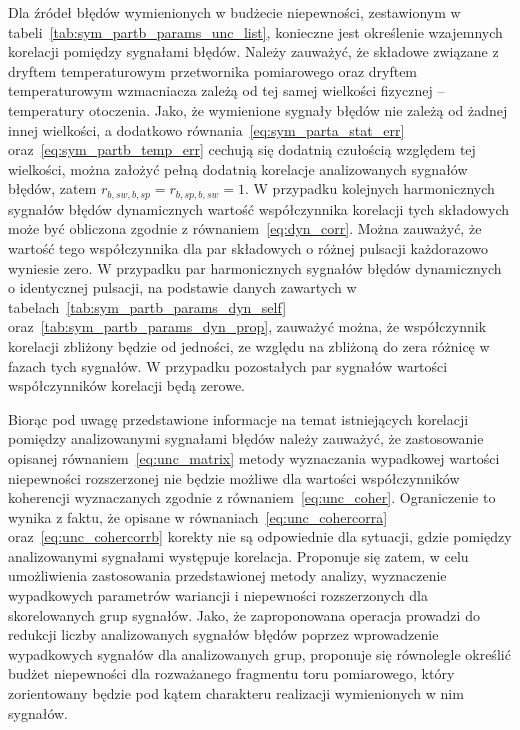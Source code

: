 Dla źródeł błędów wymienionych w budżecie niepewności, zestawionym w tabeli~\ref{tab:sym_partb_params_unc_list}, konieczne jest określenie wzajemnych korelacji pomiędzy sygnałami błędów. Należy zauważyć, że składowe związane z dryftem temperaturowym przetwornika pomiarowego oraz dryftem temperaturowym wzmacniacza zależą od tej samej wielkości fizycznej -- temperatury otoczenia. Jako, że wymienione sygnały błędów nie zależą od żadnej innej wielkości, a dodatkowo równania~\eqref{eq:sym_parta_stat_err} oraz~\eqref{eq:sym_partb_temp_err} cechują się dodatnią czułością względem tej wielkości, można założyć pełną dodatnią korelacje analizowanych sygnałów błędów, zatem $r_{b,sw,b,sp} = r_{b,sp,b,sw} = 1$. W przypadku kolejnych harmonicznych sygnałów błędów dynamicznych wartość współczynnika korelacji tych składowych może być obliczona zgodnie z równaniem~\eqref{eq:dyn_corr}. Można zauważyć, że wartość tego współczynnika dla par składowych o różnej pulsacji każdorazowo wyniesie zero. W przypadku par harmonicznych sygnałów błędów dynamicznych o identycznej pulsacji, na podstawie danych zawartych w tabelach~\ref{tab:sym_partb_params_dyn_self} oraz~\ref{tab:sym_partb_params_dyn_prop}, zauważyć można, że współczynnik korelacji zbliżony będzie od jedności, ze względu na zbliżoną do zera różnicę w fazach tych sygnałów. W przypadku pozostałych par sygnałów wartości współczynników korelacji będą zerowe.

Biorąc pod uwagę przedstawione informacje na temat istniejących korelacji pomiędzy analizowanymi sygnałami błędów należy zauważyć, że zastosowanie opisanej równaniem~\eqref{eq:unc_matrix} metody wyznaczania wypadkowej wartości niepewności rozszerzonej nie będzie możliwe dla wartości współczynników koherencji wyznaczanych zgodnie z równaniem~\eqref{eq:unc_coher}. Ograniczenie to wynika z faktu, że opisane w równaniach~\eqref{eq:unc_cohercorra} oraz~\eqref{eq:unc_cohercorrb} korekty nie są odpowiednie dla sytuacji, gdzie pomiędzy analizowanymi sygnałami występuje korelacja. Proponuje się zatem, w celu umożliwienia zastosowania przedstawionej metody analizy, wyznaczenie wypadkowych parametrów wariancji i niepewności rozszerzonych dla skorelowanych grup sygnałów. Jako, że zaproponowana operacja prowadzi do redukcji liczby analizowanych sygnałów błędów poprzez wprowadzenie wypadkowych sygnałów dla analizowanych grup, proponuje się równolegle określić budżet niepewności dla rozważanego fragmentu toru pomiarowego, który zorientowany będzie pod kątem charakteru realizacji wymienionych w nim sygnałów.

